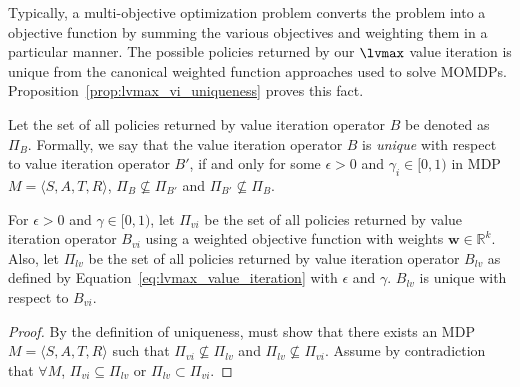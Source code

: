 Typically, a multi-objective optimization problem converts the problem into a objective function by summing the various objectives and weighting them in a particular manner. The possible policies returned by our $\lvmax$ value iteration is unique from the canonical weighted function approaches used to solve MOMDPs. Proposition~\ref{prop:lvmax_vi_uniqueness} proves this fact.

Let the set of all policies returned by value iteration operator $B$ be denoted as $\Pi_B$. Formally, we say that the value iteration operator $B$ is \emph{unique} with respect to value iteration operator $B'$, if and only for some $\epsilon > 0$ and $\gamma_i \in [0, 1)$ in MDP $M = \langle S, A, T, R \rangle$, $\Pi_B \not\subseteq \Pi_{B'}$ and $\Pi_{B'} \not\subseteq \Pi_B$.

\begin{proposition}
    \label{prop:lvmax_vi_uniqueness}
    For $\epsilon > 0$ and $\gamma \in [0, 1)$, let $\Pi_{vi}$ be the set of all policies returned by value iteration operator $B_{vi}$ using a weighted objective function with weights $\mathbf{w} \in \mathbb{R}^k$. Also, let $\Pi_{lv}$ be the set of all policies returned by value iteration operator $B_{lv}$ as defined by Equation~\ref{eq:lvmax_value_iteration} with $\epsilon$ and $\gamma$. $B_{lv}$ is unique with respect to $B_{vi}$.
\end{proposition}

\begin{proof}
By the definition of uniqueness, must show that there exists an MDP $M = \langle S, A, T, R \rangle$ such that $\Pi_{vi} \not\subseteq \Pi_{lv}$ and $\Pi_{lv} \not\subseteq \Pi_{vi}$. Assume by contradiction that $\forall M$, $\Pi_{vi} \subseteq \Pi_{lv}$ or $\Pi_{lv} \subset \Pi_{vi}$.

\end{proof}
